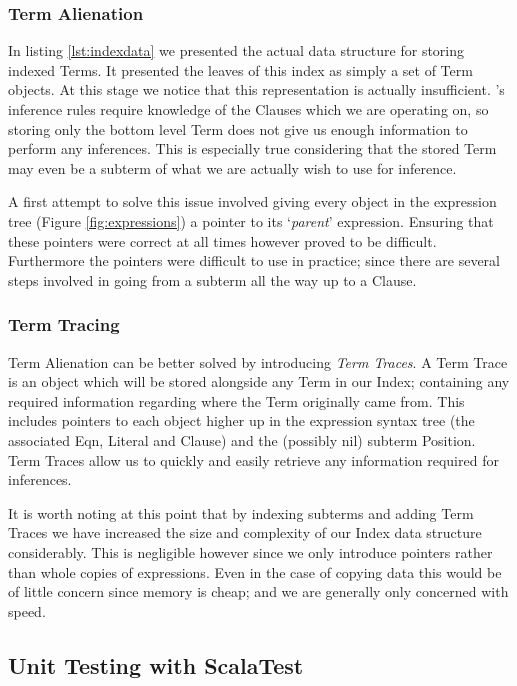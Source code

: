 \subsubsection{Term Alienation}
In listing \ref{lst:indexdata} we presented the actual data structure for storing
indexed Terms. It presented the leaves of this index as simply a set of Term objects.
At this stage we notice that this representation is actually insufficient. \Beagle's
inference rules require knowledge of the Clauses which we are operating on, so
storing only the bottom level Term does not give us enough information to perform any
inferences. This is especially true considering that the stored Term may even
be a subterm of what we are actually wish to use for inference.

A first attempt to solve this issue involved giving every object in the expression
tree (Figure \ref{fig:expressions}) a pointer to its `\emph{parent}' expression.
Ensuring that these pointers were correct at all times however proved to be
difficult. Furthermore the pointers were difficult to use in practice; since there
are several steps involved in going from a subterm all the way up to a Clause.

\subsubsection{Term Tracing}

Term Alienation can be better solved by introducing \emph{Term Traces}. A Term Trace
is an object which will be stored alongside any Term in our Index; containing any
required information regarding where the Term originally came from. This includes
pointers to each object higher up in the expression syntax tree (the associated Eqn, Literal
and Clause) and the (possibly nil) subterm Position. Term Traces allow us to quickly
and easily retrieve any information required for inferences.
 
It is worth noting at this point that by indexing subterms and adding Term Traces we have
increased the size and complexity of our Index data structure considerably.
This is negligible however since we only introduce pointers rather than whole
copies of expressions. Even in the case of copying data this would be of little
concern since memory is cheap; and we are generally only concerned with speed.

\subsection{Unit Testing with ScalaTest}
\label{sec:unittest}


